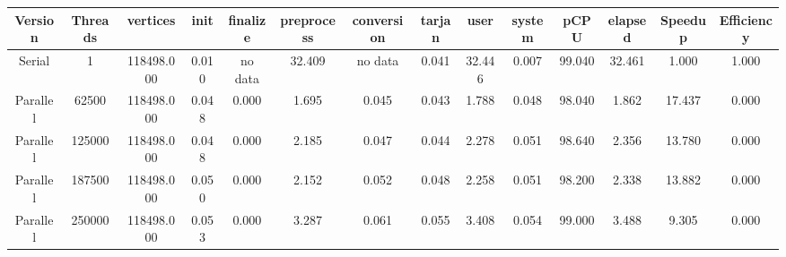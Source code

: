 \begin{tabular}{|c|c|c|c|c|c|c|c|c|c|c|c|c|c|}
\toprule
 Version &  Threads &   vertices &  init & finalize &  preprocess & conversion &  tarjan &   user &  system &   pCPU &  elapsed &  Speedup &  Efficiency \\
\midrule
  Serial &        1 & 118498.000 & 0.010 &  no data &      32.409 &    no data &   0.041 & 32.446 &   0.007 & 99.040 &   32.461 &    1.000 &       1.000 \\
Parallel &    62500 & 118498.000 & 0.048 &    0.000 &       1.695 &      0.045 &   0.043 &  1.788 &   0.048 & 98.040 &    1.862 &   17.437 &       0.000 \\
Parallel &   125000 & 118498.000 & 0.048 &    0.000 &       2.185 &      0.047 &   0.044 &  2.278 &   0.051 & 98.640 &    2.356 &   13.780 &       0.000 \\
Parallel &   187500 & 118498.000 & 0.050 &    0.000 &       2.152 &      0.052 &   0.048 &  2.258 &   0.051 & 98.200 &    2.338 &   13.882 &       0.000 \\
Parallel &   250000 & 118498.000 & 0.053 &    0.000 &       3.287 &      0.061 &   0.055 &  3.408 &   0.054 & 99.000 &    3.488 &    9.305 &       0.000 \\
\bottomrule
\end{tabular}

